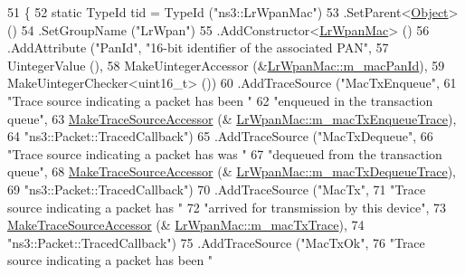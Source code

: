 \begin{DoxyCode}
51 \{
52   \textcolor{keyword}{static} TypeId tid = TypeId (\textcolor{stringliteral}{"ns3::LrWpanMac"})
53     .SetParent<\hyperlink{classns3_1_1Object_a40860402e64d8008fb42329df7097cdb}{Object}> ()
54     .SetGroupName (\textcolor{stringliteral}{"LrWpan"})
55     .AddConstructor<\hyperlink{classns3_1_1LrWpanMac_ae85526f526890de95937d9e6f1771403}{LrWpanMac}> ()
56     .AddAttribute (\textcolor{stringliteral}{"PanId"}, \textcolor{stringliteral}{"16-bit identifier of the associated PAN"},
57                    UintegerValue (),
58                    MakeUintegerAccessor (&\hyperlink{classns3_1_1LrWpanMac_abb75c742ae20c41dd10a721605328a82}{LrWpanMac::m\_macPanId}),
59                    MakeUintegerChecker<uint16\_t> ())
60     .AddTraceSource (\textcolor{stringliteral}{"MacTxEnqueue"},
61                      \textcolor{stringliteral}{"Trace source indicating a packet has been "}
62                      \textcolor{stringliteral}{"enqueued in the transaction queue"},
63                      \hyperlink{group__tracing_gab21a770b9855af4e8f69f7531ea4a6b0}{MakeTraceSourceAccessor} (&
      \hyperlink{classns3_1_1LrWpanMac_ab5d97c9ba008e159e541ec27df3480ea}{LrWpanMac::m\_macTxEnqueueTrace}),
64                      \textcolor{stringliteral}{"ns3::Packet::TracedCallback"})
65     .AddTraceSource (\textcolor{stringliteral}{"MacTxDequeue"},
66                      \textcolor{stringliteral}{"Trace source indicating a packet has was "}
67                      \textcolor{stringliteral}{"dequeued from the transaction queue"},
68                      \hyperlink{group__tracing_gab21a770b9855af4e8f69f7531ea4a6b0}{MakeTraceSourceAccessor} (&
      \hyperlink{classns3_1_1LrWpanMac_ac59ab298ffb0b3608f5813dd237982db}{LrWpanMac::m\_macTxDequeueTrace}),
69                      \textcolor{stringliteral}{"ns3::Packet::TracedCallback"})
70     .AddTraceSource (\textcolor{stringliteral}{"MacTx"},
71                      \textcolor{stringliteral}{"Trace source indicating a packet has "}
72                      \textcolor{stringliteral}{"arrived for transmission by this device"},
73                      \hyperlink{group__tracing_gab21a770b9855af4e8f69f7531ea4a6b0}{MakeTraceSourceAccessor} (&
      \hyperlink{classns3_1_1LrWpanMac_ab92d16ed0eba3f4357b949c0685c1a96}{LrWpanMac::m\_macTxTrace}),
74                      \textcolor{stringliteral}{"ns3::Packet::TracedCallback"})
75     .AddTraceSource (\textcolor{stringliteral}{"MacTxOk"},
76                      \textcolor{stringliteral}{"Trace source indicating a packet has been "}

\end{DoxyCode}
